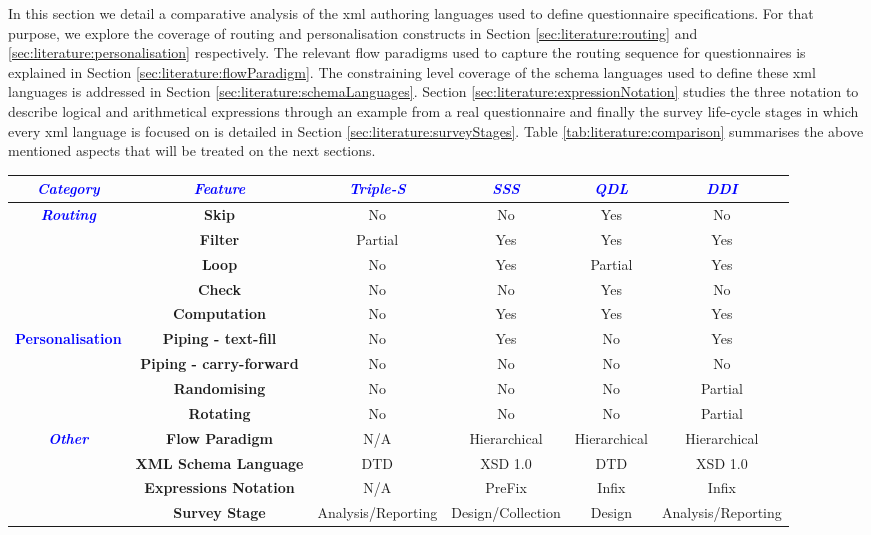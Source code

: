 	In this section we detail a comparative analysis of the \gls{xml} authoring languages used to define questionnaire specifications. For that purpose, we explore the coverage of routing and personalisation constructs in Section \ref{sec:literature:routing} and \ref{sec:literature:personalisation} respectively. The relevant flow paradigms used to capture the routing sequence for questionnaires is explained in Section \ref{sec:literature:flowParadigm}. The constraining level coverage of the schema languages used to define these \gls{xml} languages is addressed in Section \ref{sec:literature:schemaLanguages}. Section \ref{sec:literature:expressionNotation} studies the three notation to describe logical and arithmetical expressions through an example from a real questionnaire and finally the survey life-cycle stages in which every \gls{xml} language is focused on is detailed in Section \ref{sec:literature:surveyStages}. Table \ref{tab:literature:comparison} summarises the above mentioned aspects that will be treated on the next sections.

	\begin{sidewaystable}
	\begin{center}
	\begin{tabular}{|c|c|c|c|c|c|}
	\hline 
	\textbf{\textcolor{blue}{\emph{Category}}} & \textbf{\textcolor{blue}{\emph{Feature}}} & \textbf{\textcolor{blue}{\emph{Triple-S}}} & \textbf{\textcolor{blue}{\emph{SSS}}} & \textbf{\textcolor{blue}{\emph{QDL}}} & \textbf{\textcolor{blue}{\emph{DDI}}}\tabularnewline
	\hline 
	\hline 
	\multirow{5}{*}{\textbf{\textcolor{blue}{\emph{Routing}}}} & \textbf{Skip} & No & No & Yes & No\tabularnewline
	\cline{2-6} 
	 & \textbf{Filter} & Partial & Yes & Yes & Yes\tabularnewline
	\cline{2-6} 
	 & \textbf{Loop} & No & Yes & Partial & Yes\tabularnewline
	\cline{2-6} 
	 & \textbf{Check} & No & No & Yes & No\tabularnewline
	\cline{2-6} 
	 & \textbf{Computation} & No & Yes & Yes & Yes\tabularnewline
	\hline 
	\multirow{4}{*}{\textbf{\textcolor{blue}{Personalisation}}} & \textbf{Piping - text-fill} & No & Yes & No & Yes\tabularnewline
	\cline{2-6} 
	 & \textbf{Piping - carry-forward} & No & No & No & No\tabularnewline
	\cline{2-6} 
	 & \textbf{Randomising} & No & No & No & Partial\tabularnewline
	\cline{2-6} 
	 & \textbf{Rotating} & No & No & No & Partial\tabularnewline
	\hline 
	\multirow{4}{*}{\textbf{\textcolor{blue}{\emph{Other}}}} & \textbf{Flow Paradigm} & N/A & Hierarchical & Hierarchical & Hierarchical\tabularnewline
	\cline{2-6} 
	 & \textbf{XML Schema Language} & DTD & XSD 1.0 & DTD & XSD 1.0\tabularnewline
	\cline{2-6} 
	 & \textbf{Expressions Notation} & N/A & PreFix & Infix & Infix\tabularnewline
	\cline{2-6} 
	 & \textbf{Survey Stage} & Analysis/Reporting & Design/Collection & Design & Analysis/Reporting\tabularnewline
	\hline 
	\end{tabular}
	\caption{Comparison of XML languages for electronic questionnaires}
	\label{tab:literature:comparison}
	\end{center}
	\end{sidewaystable}